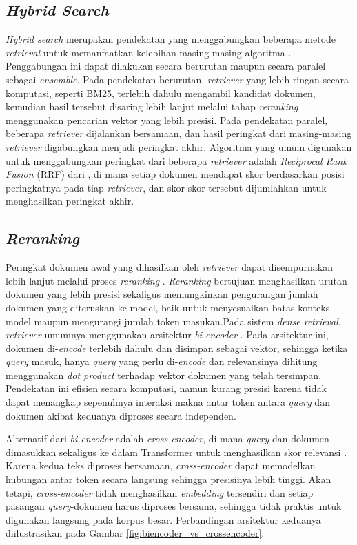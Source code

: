 \subsection{\textit{Hybrid Search}}
\textit{Hybrid search} merupakan pendekatan yang menggabungkan beberapa metode \textit{retrieval} untuk memanfaatkan kelebihan masing-masing algoritma \parencite{huyenAIEngineeringBuilding2025}. Penggabungan ini dapat dilakukan secara berurutan maupun secara paralel sebagai \textit{ensemble}. Pada pendekatan berurutan, \textit{retriever} yang lebih ringan secara komputasi, seperti BM25, terlebih dahulu mengambil kandidat dokumen, kemudian hasil tersebut disaring lebih lanjut melalui tahap \textit{reranking} menggunakan pencarian vektor yang lebih presisi. Pada pendekatan paralel, beberapa \textit{retriever} dijalankan bersamaan, dan hasil peringkat dari masing-masing \textit{retriever} digabungkan menjadi peringkat akhir. Algoritma yang umum digunakan untuk menggabungkan peringkat dari beberapa \textit{retriever} adalah \textit{Reciprocal Rank Fusion} (RRF) dari \textcite{cormackReciprocalRankFusion2009}, di mana setiap dokumen mendapat skor berdasarkan posisi peringkatnya pada tiap \textit{retriever}, dan skor-skor tersebut dijumlahkan untuk menghasilkan peringkat akhir.

\subsection{\textit{Reranking}}
Peringkat dokumen awal yang dihasilkan oleh \textit{retriever} dapat disempurnakan lebih lanjut melalui proses \textit{reranking} \parencite{huyenAIEngineeringBuilding2025}. \textit{Reranking} bertujuan menghasilkan urutan dokumen yang lebih presisi sekaligus memungkinkan pengurangan jumlah dokumen yang diteruskan ke model, baik untuk menyesuaikan batas konteks model maupun mengurangi jumlah token masukan.Pada sistem \textit{dense retrieval}, \textit{retriever} umumnya menggunakan arsitektur \textit{bi-encoder} \parencite{jm3}. Pada arsitektur ini, dokumen di-\textit{encode} terlebih dahulu dan disimpan sebagai vektor, sehingga ketika \textit{query} masuk, hanya \textit{query} yang perlu di-\textit{encode} dan relevansinya dihitung menggunakan \textit{dot product} terhadap vektor dokumen yang telah tersimpan. Pendekatan ini efisien secara komputasi, namun kurang presisi karena tidak dapat menangkap sepenuhnya interaksi makna antar token antara \textit{query} dan dokumen akibat keduanya diproses secara independen.

Alternatif dari \textit{bi-encoder} adalah \textit{cross-encoder}, di mana \textit{query} dan dokumen dimasukkan sekaligus ke dalam Transformer untuk menghasilkan skor relevansi \parencite{reimersSentenceBERTSentenceEmbeddings2019}. Karena kedua teks diproses bersamaan, \textit{cross-encoder} dapat memodelkan hubungan antar token secara langsung sehingga presisinya lebih tinggi. Akan tetapi, \textit{cross-encoder} tidak menghasilkan \textit{embedding} tersendiri dan setiap pasangan \textit{query}-dokumen harus diproses bersama, sehingga tidak praktis untuk digunakan langsung pada korpus besar. Perbandingan arsitektur keduanya diilustrasikan pada Gambar \ref{fig:biencoder_vs_crossencoder}.

